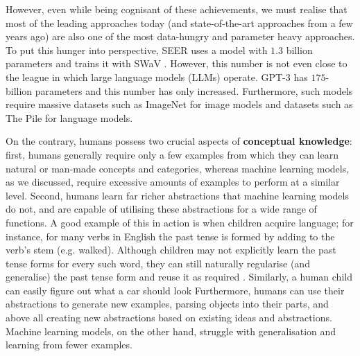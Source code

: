 However, even while being cognisant of these achievements, we must realise that most of the leading approaches today (and state-of-the-art approaches from a few years ago) are also one of the most data-hungry and parameter heavy approaches. To put this hunger into perspective, SEER \parencite{Goyal2021} uses a model with $1.3$ billion parameters and trains it with SWaV \parencite{caron2020unsupervised}. However, this number is not even close to the league in which large language models (LLMs) operate. GPT-3 \parencite{brown2020language} has $175$-billion parameters and this number has only increased. Furthermore, such models require massive datasets such as ImageNet \parencite{deng2009imagenet} for image models and datasets such as The Pile \parencite{gao2020pile} for language models.

On the contrary, humans possess two crucial aspects of \textbf{conceptual knowledge}: first, humans generally require only a few examples from which they can learn natural or man-made concepts and categories, whereas machine learning models, as we discussed, require excessive amounts of examples to perform at a similar level.
Second, humans learn far richer abstractions that machine learning models do not, and are capable of utilising these abstractions for a wide range of functions. A good example of this in action is when children acquire language; for instance, for many verbs in English the past tense is formed by adding  to the verb's stem (e.g. walked). Although children may not explicitly learn the past tense forms for every such word, they can still naturally regularise (and generalise) the past tense form and reuse it as required \parencite{marcus1992overregularization}. 
Similarly, a human child can easily figure out what a car should look
Furthermore, humans can use their abstractions to generate new examples, parsing objects into their parts, and above all creating new abstractions based on existing ideas and abstractions. Machine learning models, on the other hand, struggle with generalisation and learning from fewer examples.


